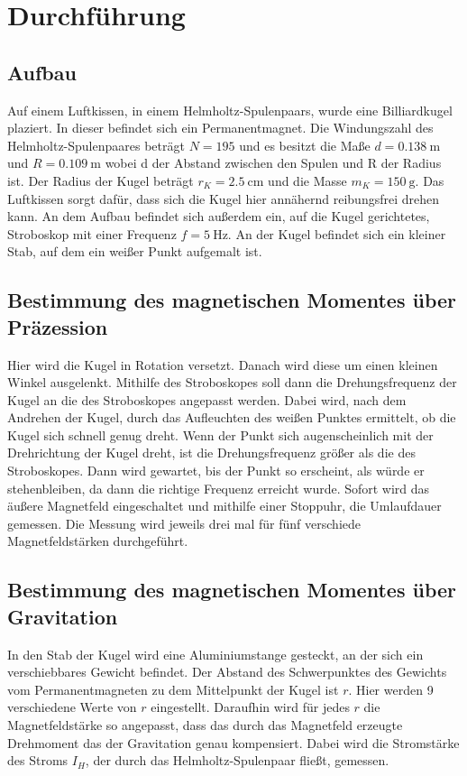 \section{Durchführung}
\label{sec:Durchführung}
\subsection{Aufbau}
Auf einem Luftkissen, in einem Helmholtz-Spulenpaars, wurde eine Billiardkugel plaziert.
In dieser befindet sich ein Permanentmagnet.
Die Windungszahl des Helmholtz-Spulenpaares beträgt $N=195$ und es besitzt die Maße $d=\qty{0.138}{\meter}$ und $R=\qty{0.109}{\meter}$ wobei d der Abstand zwischen den Spulen und R der Radius ist.
Der Radius der Kugel beträgt $r_K=\qty{2.5}{\centi\meter}$ und die Masse $m_K=\qty{150}{\gram}$.
Das Luftkissen sorgt dafür, dass sich die Kugel hier annähernd reibungsfrei drehen kann.
An dem Aufbau befindet sich außerdem ein, auf die Kugel gerichtetes, Stroboskop mit einer Frequenz $f=\qty{5}{\hertz}$.
An der Kugel befindet sich ein kleiner Stab, auf dem ein weißer Punkt aufgemalt ist.



\subsection{Bestimmung des magnetischen Momentes über Präzession}
Hier wird die Kugel in Rotation versetzt.
Danach wird diese um einen kleinen Winkel ausgelenkt.
Mithilfe des Stroboskopes soll dann die Drehungsfrequenz der Kugel an die des Stroboskopes angepasst werden.
Dabei wird, nach dem Andrehen der Kugel, durch das Aufleuchten des weißen Punktes ermittelt, ob die Kugel sich schnell genug dreht.
Wenn der Punkt sich augenscheinlich mit der Drehrichtung der Kugel dreht, ist die Drehungsfrequenz größer als die des Stroboskopes.
Dann wird gewartet, bis der Punkt so erscheint, als würde er stehenbleiben, da dann die richtige Frequenz erreicht wurde.
Sofort wird das äußere Magnetfeld eingeschaltet und mithilfe einer Stoppuhr, die Umlaufdauer gemessen.
Die Messung wird jeweils drei mal für fünf verschiede Magnetfeldstärken durchgeführt. 

\subsection{Bestimmung des magnetischen Momentes über Gravitation}
In den Stab der Kugel wird eine Aluminiumstange gesteckt, an der sich ein verschiebbares Gewicht befindet.
Der Abstand des Schwerpunktes des Gewichts vom Permanentmagneten zu dem Mittelpunkt der Kugel ist $r$.
Hier werden 9 verschiedene Werte von $r$ eingestellt. 
Daraufhin wird für jedes $r$ die Magnetfeldstärke so angepasst, dass das durch das Magnetfeld erzeugte Drehmoment das der Gravitation genau kompensiert.
Dabei wird die Stromstärke des Stroms $I_H$, der durch das Helmholtz-Spulenpaar fließt, gemessen.

